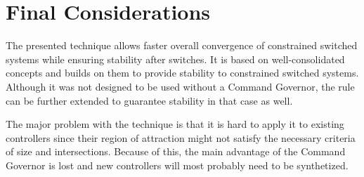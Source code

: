 
\chapter{Final Considerations}%
\label{chp:final-considerations}

The presented technique allows faster overall convergence of constrained
switched systems while ensuring stability after switches. It is based on
well-consolidated concepts and builds on them to provide stability to
constrained switched systems. Although it was not designed to be used without a
Command Governor, the rule can be further extended to guarantee stability in
that case as well.

The major problem with the technique is that it is hard to apply it to existing
controllers since their region of attraction might not satisfy the necessary
criteria of size and intersections. Because of this, the main advantage of the
Command Governor is lost and new controllers will most probably need to be
synthetized.
